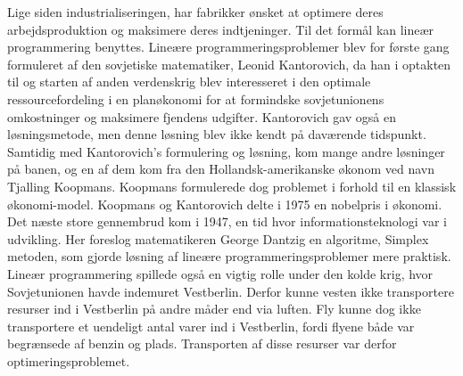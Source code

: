 Lige siden industrialiseringen, har fabrikker ønsket at optimere deres arbejdsproduktion og maksimere deres indtjeninger. 
Til det formål kan lineær programmering benyttes.
Lineære programmeringsproblemer blev for første gang formuleret af den sovjetiske matematiker, Leonid Kantorovich, da han i optakten til og starten af anden verdenskrig blev  interesseret i den optimale ressourcefordeling i en planøkonomi for at formindske sovjetunionens omkostninger og maksimere fjendens udgifter. Kantorovich gav også en løsningsmetode, men denne løsning blev ikke kendt på daværende tidspunkt.\\
Samtidig med Kantorovich's formulering og løsning, kom  mange andre løsninger på banen, og en af dem kom fra den Hollandsk-amerikanske økonom ved navn Tjalling Koopmans. 
Koopmans formulerede dog problemet i forhold til en klassisk økonomi-model. 
Koopmans og Kantorovich delte i 1975 en nobelpris i økonomi.\\
Det næste store gennembrud kom i 1947, en tid hvor informationsteknologi var i udvikling. 
Her foreslog matematikeren George Dantzig  en algoritme, Simplex metoden, som gjorde løsning af lineære programmeringsproblemer mere praktisk. 
\\%
Lineær programmering spillede også en vigtig rolle under den kolde krig, hvor Sovjetunionen havde indemuret Vestberlin.
Derfor kunne vesten ikke transportere resurser ind i Vestberlin på andre måder end via luften.
Fly kunne dog ikke transportere et uendeligt antal varer ind i Vestberlin, fordi flyene både var begrænsede af benzin og plads. 
Transporten af disse resurser var derfor optimeringsproblemet. \citep{bert} \citep{lay}